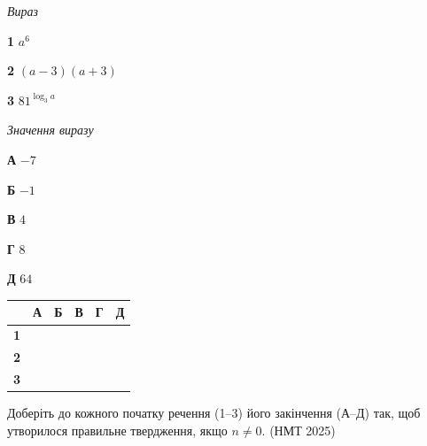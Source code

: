 \documentclass[14pt]{extarticle}
\newcommand{\matchTable}{
\begin{tabular}{|>{\centering\arraybackslash}p{0.25cm}|*{5}{>{\centering\arraybackslash}p{0.25cm}|}}
\hline
& \scriptsize\textbf{А} & \scriptsize\textbf{Б} & \scriptsize\textbf{В} & \scriptsize\textbf{Г} & \scriptsize\textbf{Д} \\
\hline
\scriptsize\textbf{1} & \rule{0pt}{0.25cm} & & & & \\
\hline
\scriptsize\textbf{2} & \rule{0pt}{0.25cm} & & & & \\
\hline
\scriptsize\textbf{3} & \rule{0pt}{0.25cm} & & & & \\
\hline
\end{tabular}
}
\newcommand{\task}[2]{\noindent\makebox[1.5em][l]{\textbf{#1.}}\parbox[t]{\dimexpr\textwidth-1.5em}{#2}}
\newcommand{\nmtyear}[1]{\hfill{\small\color{yearcolor}(НМТ #1)}}
\begin{document}
\vspace{0.3cm}
\noindent
\begin{minipage}[t]{0.25\textwidth}
\vspace{0pt}
\textit{Вираз}

\vspace{0.2cm}
\textbf{1} \quad $a^6$

\vspace{0.2cm}
\textbf{2} \quad $(a - 3)(a + 3)$

\vspace{0.2cm}
\textbf{3} \quad $81^{\log_3 a}$
\end{minipage}
\hfill
\begin{minipage}[t]{0.3\textwidth}
\vspace{0pt}
\textit{Значення виразу}

\vspace{0.2cm}
\textbf{А} \quad $-7$

\vspace{0.2cm}
\textbf{Б} \quad $-1$

\vspace{0.2cm}
\textbf{В} \quad $4$

\vspace{0.2cm}
\textbf{Г} \quad $8$

\vspace{0.2cm}
\textbf{Д} \quad $64$
\end{minipage}
\hfill
\begin{minipage}[t]{0.18\textwidth}
\vspace{0pt}
\matchTable
\end{minipage}

\vspace{0.7cm}

\task{38}{Доберіть до кожного початку речення (1--3) його закінчення (А--Д) так, щоб утворилося правильне твердження, якщо $n \neq 0$. \nmtyear{2025}}
\end{document}
